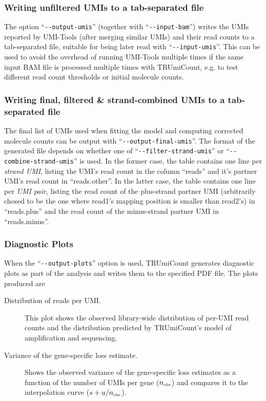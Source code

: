 \documentclass[a4paper]{scrartcl}
\newcommand{\ddarg}[1]{\texttt{-{}-#1}}
\begin{document}
\subsubsection*{Writing unfiltered UMIs to a tab-separated file }

The option ``\ddarg{output-umis}'' (together with ``\ddarg{input-bam}'') writes the UMIs reported by UMI-Tools (after merging similar UMIs) and their read counts to a tab-separated file, suitable for being later read with ``\ddarg{input-umis}''. This can be used to avoid the overhead of running UMI-Tools multiple times if the same input BAM file is processed multiple times with TRUmiCount, e.g. to test different read count thresholds or initial molecule counts.

\subsubsection*{Writing final, filtered \& strand-combined UMIs to a tab-separated file }

The final list of UMIs used when fitting the model and computing corrected molecule counts can be output with ``\ddarg{output-final-umis}''. The format of the generated file depends on whether one of ``\ddarg{filter-strand-umis}'' or ``\ddarg{combine-strand-umis}'' is used. In the former case, the table contains one line per \emph{strand UMI}, listing the UMI's read count in the column ``reads'' and it's partner UMI's read count in ``reads.other''. In the latter case, the table contains one line per \emph{UMI pair}, listing the read count of the plus-strand partner UMI (arbitrarily chosed to be the one where read1's mapping position is smaller than read2's) in ``reads.plus'' and the read count of the minus-strand partner UMI in ``reads.minus''.

\subsubsection*{Diagnostic Plots}

When the ``\ddarg{output-plots}'' option is used, TRUmiCount generates diagnostic plots as part of the analysis and writes them to the specified PDF file. The plots produced are

\begin{description}
\item[Distribution of reads per UMI.] This plot shows the observed library-wide distribution of per-UMI read counts and the distribution predicted by TRUmiCount's model of amplification and sequencing.

\item[Variance of the gene-specific loss estimate.] Shows the observed variance of the gene-specific loss estimates as a function of the number of UMIs per gene ($n_{\textrm{\tiny obs}}$) and compares it to the interpolation curve ($s + u / n_{\textrm{\tiny obs}}$).
\end{description}
\end{document}
